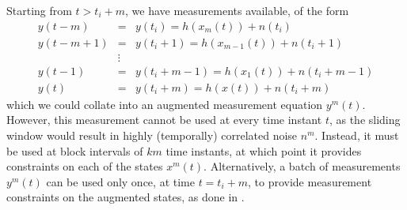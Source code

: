 \documentclass[]{article}
\begin{document}
Starting from $t > t_i + m$, we have measurements available, of the form
\begin{eqnarray}
y(t-m) &=& y(t_i) = h(x_m(t)) + n(t_i) \\
y(t-m+1) &=& y(t_i+1) = h(x_{m-1}(t)) + n(t_i + 1) \\
&\vdots& \\
y(t-1) &=& y(t_i+m-1) = h(x_{1}(t)) + n(t_i + m -1)\\
y(t) &=& y(t_i+m) = h(x(t)) + n(t_i + m)
\end{eqnarray}
which we could collate into an augmented measurement equation $y^m(t)$. However, this measurement cannot be used at every time instant $t$, as the sliding window would result in highly (temporally) correlated noise $n^m$. Instead, it must be used at block intervals of $km$ time instants, at which point it provides constraints on each of the states $x^m(t)$. Alternatively, a batch of measurements $y^m(t)$ can be used only once, at time $t = t_i + m$, to provide measurement constraints on the augmented states, as done in \cite{mourikisR07}.





\end{document}
